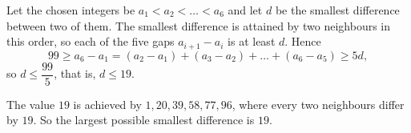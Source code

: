 Let the chosen integers be $a_1<a_2<\dots<a_6$ and let $d$ be the smallest difference between two of them. The smallest difference is attained by two neighbours in this order, so each of the five gaps $a_{i+1}-a_i$ is at least $d$. Hence
\[
99\ge a_6-a_1=(a_2-a_1)+(a_3-a_2)+\dots+(a_6-a_5)\ge5d,
\]
so $d\le\dfrac{99}{5}$, that is, $d\le19$.

The value $19$ is achieved by $1,20,39,58,77,96$, where every two neighbours differ by $19$. So the largest possible smallest difference is $\boxed{19}$.
